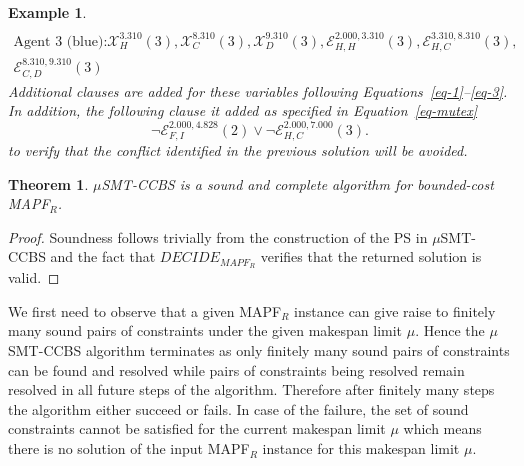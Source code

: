 \documentclass[review]{elsarticle}
\newtheorem{theorem}{Theorem}
\newtheorem{example}{Example}
\newcommand{\decidemapfr}{\ensuremath{\mathit{DECIDE_{MAPF_R}}}\xspace}
\newcommand\roni[1]{\nb{\textbf{Roni:}}{green}{#1}}
\newcommand\pavel[1]{\nb{\textbf{Pavel:}}{blue}{#1}}
\newcommand{\ps}{\ac{PS}\xspace}
\newcommand{\mapfr}{\ac{MAPF}$_R$\xspace}
\newcommand{\smtccbs}{SMT-CCBS\xspace}
\begin{document}
\begin{example}
\begin{multline*}
\end{multline*}
\begin{multline*}
    \text{Agent 3 (blue):}
    \mathcal{X}_H^{3.310}(3), \mathcal{X}_C^{8.310}(3),
\mathcal{X}_D^{9.310}(3), 
\mathcal{E}_{H,H}^{2.000,3.310}(3), \mathcal{E}_{H,C}^{3.310,8.310}(3),\\ \mathcal{E}_{C,D}^{8.310,9.310}(3)
\end{multline*}
Additional clauses are added for these variables following Equations~\ref{eq-1}--\ref{eq-3}. 
In addition, the following clause it added as specified in Equation~\ref{eq-mutex}
\begin{equation}
  \neg \mathcal{E}_{F,I}^{2.000,4.828}(2) \vee \neg \mathcal{E}_{H,C}^{2.000,7.000}(3).
\end{equation}
to verify that the conflict identified in the previous solution will be avoided.
\end{example}


\begin{theorem}
$\mu$\smtccbs is a sound and complete algorithm for bounded-cost \mapfr. 
\label{the:bounded-cost-makespan}
\end{theorem}
\begin{proof}
Soundness follows trivially from the construction of the \ps in $\mu$\smtccbs and the fact that \decidemapfr verifies that the returned solution is valid. 

\end{proof}

We first need to observe that a given \mapfr instance can give raise to finitely many sound pairs of constraints under the given makespan limit $\mu$. Hence the $\mu$\smtccbs algorithm terminates as only finitely many sound pairs of constraints can be found and resolved while pairs of constraints being resolved remain resolved in all future steps of the algorithm. Therefore after finitely many steps the algorithm either succeed or fails. In case of the failure, the set of sound constraints cannot be satisfied for the current makespan limit $\mu$ which means there is no solution of the input \mapfr instance for this makespan limit $\mu$.
\end{document}
